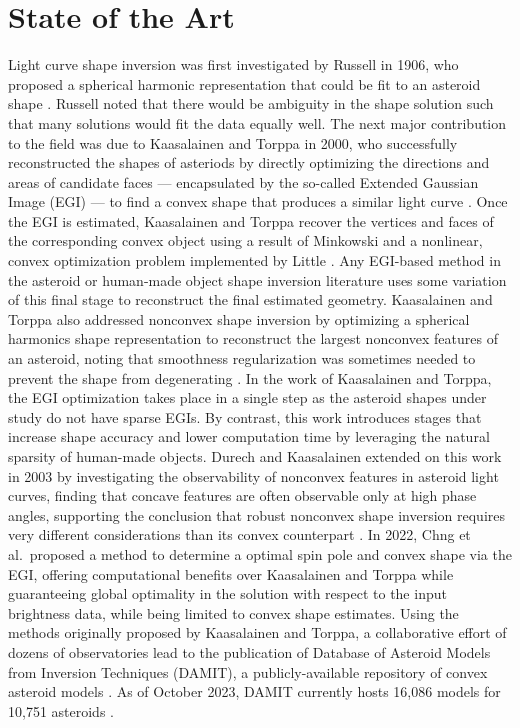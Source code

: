 \section{State of the Art}

Light curve shape inversion was first investigated by Russell in 1906, who proposed a spherical harmonic representation that could be fit to an asteroid shape \cite{russell1906}. Russell noted that there would be ambiguity in the shape solution such that many solutions would fit the data equally well. The next major contribution to the field was due to Kaasalainen and Torppa in 2000, who successfully reconstructed the shapes of asteriods by directly optimizing the directions and areas of candidate faces --- encapsulated by the so-called Extended Gaussian Image (EGI) --- to find a convex shape that produces a similar light curve \cite{kaasalainen2000, kaasalainen2001}. Once the EGI is estimated, Kaasalainen and Torppa recover the vertices and faces of the corresponding convex object using a result of Minkowski and a nonlinear, convex optimization problem implemented by Little \cite{minkowski1909, little1983}. Any EGI-based method in the asteroid or human-made object shape inversion literature uses some variation of this final stage to reconstruct the final estimated geometry. Kaasalainen and Torppa also addressed nonconvex shape inversion by optimizing a spherical harmonics shape representation to reconstruct the largest nonconvex features of an asteroid, noting that smoothness regularization was sometimes needed to prevent the shape from degenerating \cite{kaasalainen2000}. In the work of Kaasalainen and Torppa, the EGI optimization takes place in a single step as the asteroid shapes under study do not have sparse EGIs. By contrast, this work introduces stages that increase shape accuracy and lower computation time by leveraging the natural sparsity of human-made objects. Durech and Kaasalainen extended on this work in 2003 by investigating the observability of nonconvex features in asteroid light curves, finding that concave features are often observable only at high phase angles, supporting the conclusion that robust nonconvex shape inversion requires very different considerations than its convex counterpart \cite{durech2003}. In 2022, Chng et al.\ proposed a method to determine a optimal spin pole and convex shape via the EGI, offering computational benefits over Kaasalainen and Torppa while guaranteeing global optimality in the solution with respect to the input brightness data, while being limited to convex shape estimates\cite{chng2022}. Using the methods originally proposed by Kaasalainen and Torppa, a collaborative effort of dozens of observatories lead to the publication of Database of Asteroid Models from Inversion Techniques (DAMIT), a publicly-available repository of convex asteroid models \cite{durech2010}. As of October 2023, DAMIT currently hosts 16,086 models for 10,751 asteroids \cite{damit2014}.

